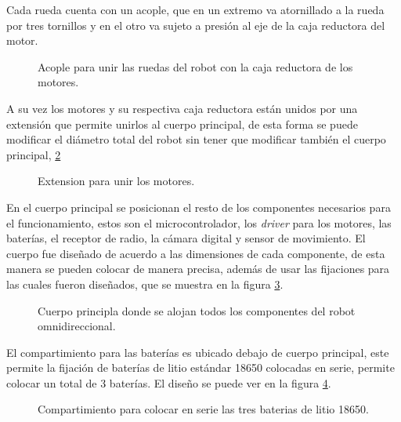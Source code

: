 \documentclass{iccmemoria}
\begin{document}
Cada rueda cuenta con un acople, que en un extremo va atornillado a la rueda por tres tornillos y en el otro va sujeto a presión al eje de la caja reductora del motor.\\

\begin{figure}[H]
  \centering
  
  \caption{Acople para unir las ruedas del robot con la caja reductora de los motores.}
  \label{fig:arm}
\end{figure}

A su vez los motores y su respectiva caja reductora están unidos por una extensión que permite unirlos al cuerpo principal, de esta forma se puede modificar el diámetro total del robot sin tener que modificar también el cuerpo principal, \ref{fig:arm}\\

\begin{figure}[H]
  \centering
  
  \caption{Extension para unir los motores.}
  \label{fig:arm}
\end{figure}

En el cuerpo principal se posicionan el resto de los componentes necesarios para el funcionamiento, estos son el microcontrolador, los \emph{driver} para los motores, las baterías, el receptor de radio, la cámara digital y sensor de movimiento. El cuerpo fue diseñado de acuerdo a las dimensiones de cada componente, de esta manera se pueden colocar de manera precisa, además de usar las fijaciones para las cuales fueron diseñados, que se muestra en la figura \ref{fig:frame}.\\

\begin{figure}[H]
  \centering
  
  \caption{Cuerpo principla donde se alojan todos los componentes del robot omnidireccional.}
  \label{fig:frame}
\end{figure}

El compartimiento para las baterías es ubicado debajo de cuerpo principal, este permite la fijación de baterías de litio estándar 18650 colocadas en serie, permite colocar un total de 3 baterías. El diseño se puede ver en la figura \ref{fig:battery_compartment}.

\begin{figure}[H]
  \centering
  
  \caption{Compartimiento para colocar en serie las tres baterias de litio 18650.}
  \label{fig:battery_compartment}
\end{figure}
\end{document}

